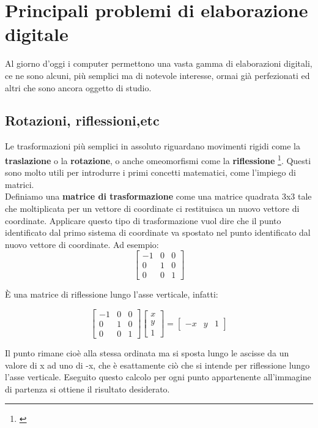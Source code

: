 \section{Principali problemi di elaborazione digitale}

Al giorno d'oggi i computer permettono una vasta gamma di elaborazioni digitali, ce ne sono alcuni, più semplici ma di notevole interesse, ormai già perfezionati ed altri che sono ancora oggetto di studio.

\subsection{Rotazioni, riflessioni,etc}
Le trasformazioni più semplici in assoluto riguardano movimenti rigidi come la \textbf{traslazione} o la \textbf{rotazione}, o anche omeomorfismi come la \textbf{riflessione} \footnote{\cite{storia}}. Questi sono molto utili per introdurre i primi concetti matematici, come l'impiego di matrici.\\
Definiamo una \textbf{matrice di trasformazione} come una matrice quadrata 3x3 tale che moltiplicata per un vettore di coordinate ci restituisca un nuovo vettore di coordinate. Applicare questo tipo di trasformazione vuol dire che il punto identificato dal primo sistema di coordinate va spostato nel punto identificato dal nuovo vettore di coordinate. Ad esempio:\\

$$
{\begin{bmatrix}
-1&0&0\\
0&1&0\\
0&0&1
\end{bmatrix}}
$$


\noindent
\`E una matrice di riflessione lungo l'asse verticale, infatti: 

$$
{\begin{bmatrix}
-1&0&0\\
0&1&0\\
0&0&1
\end{bmatrix}}
\begin{bmatrix}
x\\y\\1
\end{bmatrix}
=
\begin{bmatrix}
-x&y&1
\end{bmatrix}
$$	

\vspace{1em} \noindent
Il punto rimane cioè alla stessa ordinata ma si sposta lungo le ascisse da un valore di x ad uno di -x, che è esattamente ciò che si intende per riflessione lungo l'asse verticale. Eseguito questo calcolo per ogni punto appartenente all'immagine di partenza si ottiene il risultato desiderato.

